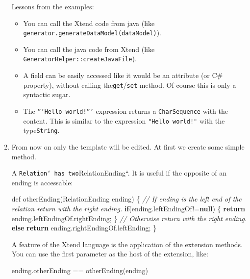 \documentclass[]{report}
\newenvironment{Shaded}{}{}
\newcommand{\KeywordTok}[1]{\textcolor[rgb]{0.00,0.44,0.13}{\textbf{{#1}}}}
\newcommand{\CommentTok}[1]{\textcolor[rgb]{0.38,0.63,0.69}{\textit{{#1}}}}
\newcommand{\FunctionTok}[1]{\textcolor[rgb]{0.02,0.16,0.49}{{#1}}}
\newcommand{\NormalTok}[1]{{#1}}
\begin{document}
\begin{enumerate}
  Lessons from the examples:

  \begin{itemize}
  \itemsep1pt\parskip0pt
  \item
    You can call the Xtend code from java (like
    \texttt{generator.generateDataModel(dataModel)}).
  \item
    You can call the java code from Xtend (like
    \texttt{GeneratorHelper::createJavaFile}).
  \item
    A field can be easily accessed like it would be an attribute (or C\#
    property), without calling the\texttt{get}/\texttt{set} method. Of
    course this is only a syntactic sugar.
  \item
    The \texttt{'''Hello world!'''} expression returns a
    \texttt{CharSequence} with the content. This is similar to the
    expression \texttt{"Hello world!"} with the type\texttt{String}.
  \end{itemize}
\item
  From now on only the template will be edited. At first we create some
  simple method.

  A \texttt{Relation` has two}RelationEnding``. It is useful if the
  opposite of an ending is accessable:

\begin{Shaded}
\begin{Highlighting}[]
\NormalTok{def }\FunctionTok{otherEnding}\NormalTok{(RelationEnding ending) \{}
    \CommentTok{// If ending is the left end of the relation return with the right ending.}
    \KeywordTok{if}\NormalTok{(ending.}\FunctionTok{leftEndingOf}\NormalTok{!=}\KeywordTok{null}\NormalTok{) \{}
        \KeywordTok{return} \NormalTok{ending.}\FunctionTok{leftEndingOf}\NormalTok{.}\FunctionTok{rightEnding}\NormalTok{;}
    \NormalTok{\}}
    \CommentTok{// Otherwise return with the right ending.}
    \KeywordTok{else} \KeywordTok{return} \NormalTok{ending.}\FunctionTok{rightEndingOf}\NormalTok{.}\FunctionTok{leftEnding}\NormalTok{;}
\NormalTok{\}}
\end{Highlighting}
\end{Shaded}

  A feature of the Xtend language is the application of the extension
  methods. You can use the first parameter as the host of the extension,
  like:

\begin{Shaded}
\begin{Highlighting}[]
\NormalTok{ending.}\FunctionTok{otherEnding} \NormalTok{== }\FunctionTok{otherEnding}\NormalTok{(ending)}
\end{Highlighting}
\end{Shaded}


\end{enumerate}
\end{document}
